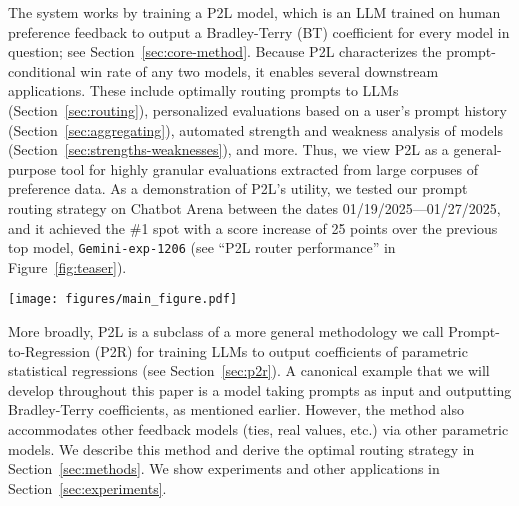 The system works by training a P2L model, which is an LLM trained on human preference feedback to output a Bradley-Terry (BT) coefficient for every model in question; see Section~\ref{sec:core-method}. 
Because P2L characterizes the prompt-conditional win rate of any two models, it enables several downstream applications.
These include optimally routing prompts to LLMs  (Section~\ref{sec:routing}), personalized evaluations based on a user's prompt history (Section~\ref{sec:aggregating}), automated strength and weakness analysis of models (Section~\ref{sec:strengths-weaknesses}), and more.
Thus, we view P2L as a general-purpose tool for highly granular evaluations extracted from large corpuses of preference data.
As a demonstration of P2L's utility, we tested our prompt routing strategy on Chatbot Arena between the dates 01/19/2025---01/27/2025, and it achieved the \#1 spot with a score increase of 25 points over the previous top model, \texttt{Gemini-exp-1206} (see ``P2L router performance'' in Figure~\ref{fig:teaser}).

\begin{figure*}
    \centering
    \texttt{[image: figures/main\_figure.pdf]}
    \caption{\textbf{Pipeline of P2L.} P2L takes a prompt or a set of prompts and outputs an $M$-dimensional vector that we call a leaderboard. Once we have a leaderboard, we can build better data products, like routers and automatic analyses (see right).}
    \label{fig:teaser}
\end{figure*}

More broadly, P2L is a subclass of a more general methodology we call Prompt-to-Regression (P2R) for training LLMs to output coefficients of parametric statistical regressions (see Section~\ref{sec:p2r}).
A canonical example that we will develop throughout this paper is a model taking prompts as input and outputting Bradley-Terry coefficients, as mentioned earlier.
However, the method also accommodates other feedback models (ties, real values, etc.) via other parametric models.
We describe this method and derive the optimal routing strategy in Section~\ref{sec:methods}.
We show experiments and other applications in Section~\ref{sec:experiments}.